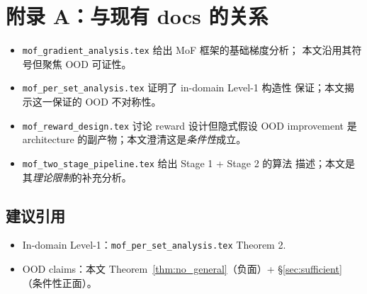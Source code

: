 \documentclass[11pt,a4paper]{article}
\theoremstyle{definition}
\begin{document}
\section*{附录 A：与现有 docs 的关系}
\label{app:relation}

\begin{itemize}[leftmargin=1.5em]
\item \texttt{mof\_gradient\_analysis.tex} 给出 MoF 框架的基础梯度分析；
本文沿用其符号但聚焦 OOD 可证性。
\item \texttt{mof\_per\_set\_analysis.tex} 证明了 in-domain Level-1 构造性
保证；本文揭示这一保证的 OOD 不对称性。
\item \texttt{mof\_reward\_design.tex} 讨论 reward 设计但隐式假设 OOD
improvement 是 architecture 的副产物；本文澄清这是\emph{条件性}成立。
\item \texttt{mof\_two\_stage\_pipeline.tex} 给出 Stage 1 + Stage 2 的算法
描述；本文是其\emph{理论限制}的补充分析。
\end{itemize}

\subsection*{建议引用}

\begin{itemize}[leftmargin=1.5em]
\item In-domain Level-1：\texttt{mof\_per\_set\_analysis.tex} Theorem 2.
\item OOD claims：本文 Theorem~\ref{thm:no_general}（负面）+ \S\ref{sec:sufficient}
（条件性正面）。
\end{itemize}
\end{document}
